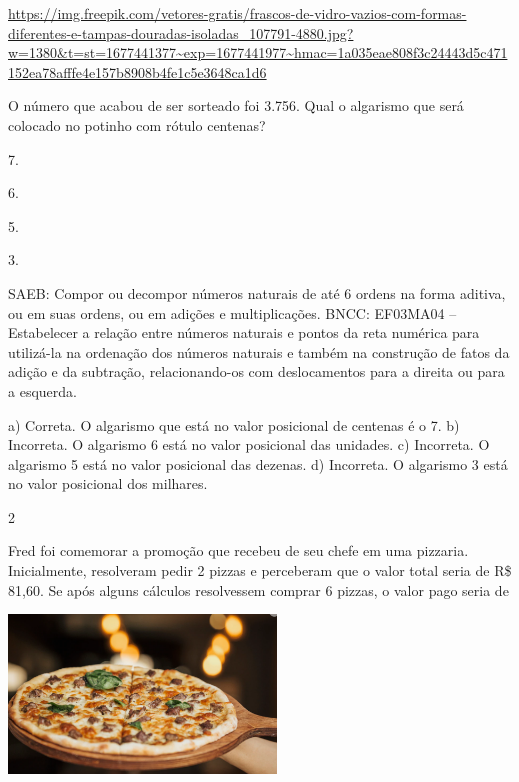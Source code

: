 \begin{multicols}{2}
{\begin{escolha}
{%

\url{https://img.freepik.com/vetores-gratis/frascos-de-vidro-vazios-com-formas-diferentes-e-tampas-douradas-isoladas_107791-4880.jpg?w=1380\&t=st=1677441377~exp=1677441977~hmac=1a035eae808f3c24443d5c471152ea78afffe4e157b8908b4fe1c5e3648ca1d6}

O número que acabou de ser sorteado foi 3.756. Qual o algarismo que será colocado no potinho com rótulo centenas?

\begin{escolha}

\item
  7.
\item
  6.
\item
  5.
\item
  3.
\end{escolha}

SAEB: Compor ou decompor números naturais de até 6 ordens na forma aditiva, ou em suas ordens, ou em adições e multiplicações.
BNCC: EF03MA04 -- Estabelecer a relação entre números naturais e pontos da reta numérica para
utilizá-la na ordenação dos números naturais e também na construção de fatos da adição e da
subtração, relacionando-os com deslocamentos para a direita ou para a esquerda.

a) Correta. O algarismo que está no valor posicional de centenas é o 7.
b) Incorreta. O algarismo 6 está no valor posicional das unidades.
c) Incorreta. O algarismo 5 está no valor posicional das dezenas.
d) Incorreta. O algarismo 3 está no valor posicional dos milhares.

\num{2}

Fred foi comemorar a promoção que recebeu de seu chefe em uma pizzaria. Inicialmente, resolveram pedir 2 pizzas e perceberam que o valor total seria de R\$ 81,60. Se após alguns cálculos resolvessem comprar 6
pizzas, o valor pago seria de

\includegraphics[width=2.80000in,height=1.66867in]{media/image131.png}

}
\end{escolha}}
\end{multicols}
